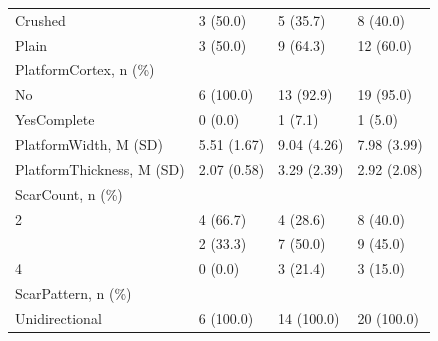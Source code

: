 \documentclass[12pt,twoside]{reedthesis}
\begin{document}
\begin{longtable}[t]{llll}
Crushed & 3 (50.0) & 5 (35.7) & 8 (40.0)\\
Plain & 3 (50.0) & 9 (64.3) & 12 (60.0)\\
PlatformCortex, n (\%) &  &  & \\
No & 6 (100.0) & 13 (92.9) & 19 (95.0)\\
\addlinespace
YesComplete & 0 (0.0) & 1 (7.1) & 1 (5.0)\\
PlatformWidth, M (SD) & 5.51 (1.67) & 9.04 (4.26) & 7.98 (3.99)\\
PlatformThickness, M (SD) & 2.07 (0.58) & 3.29 (2.39) & 2.92 (2.08)\\
ScarCount, n (\%) &  &  & \\
2 & 4 (66.7) & 4 (28.6) & 8 (40.0)\\
\addlinespace
3 & 2 (33.3) & 7 (50.0) & 9 (45.0)\\
4 & 0 (0.0) & 3 (21.4) & 3 (15.0)\\
ScarPattern, n (\%) &  &  & \\
Unidirectional & 6 (100.0) & 14 (100.0) & 20 (100.0)\\*
\end{longtable}
\endgroup{}
\end{document}
